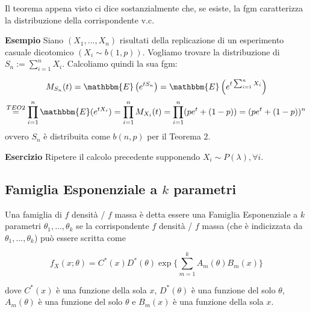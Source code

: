 \begin{oss}
Il teorema appena visto ci dice sostanzialmente che, se esiste, la fgm caratterizza la distribuzione della corrispondente v.c.
\end{oss}
\noindent \textbf{Esempio}
Siano $(X_1,...,X_n)$ risultati della replicazione di un esperimento casuale dicotomico $(X_i \sim b(1,p))$. Vogliamo trovare la distribuzione di $S_n := \displaystyle\sum_{i=1}^n X_i$. Calcoliamo quindi la sua fgm:

$$M_{S_n}(t) = \mathbbm{E} \left( {e^{t S_n}} \right)  = \mathbbm{E} \left( {e^{t \sum_{i=1}^n X_i}} \right) $$
$$\stackrel{TEO 2}
{=} \displaystyle\prod_{i=1}^n \mathbbm{E}({e^{tX_i}}) = \displaystyle\prod_{i=1}^n M_{X_i}(t) = \displaystyle\prod_{i=1}^n (p e^t + (1-p)) = (p e^t + (1-p))^n$$ ovvero $S_n$ è distribuita come $b(n,p)$ per il Teorema 2.

\noindent \textbf{Esercizio}
Ripetere il calcolo precedente supponendo $X_i \sim P(\lambda), \forall i$.

\subsection{Famiglia Esponenziale a $k$ parametri}
Una famiglia di $f$ densità / $f$ massa è detta essere una Famiglia Esponenziale a $k$ parametri $\theta_1,...,\theta_k$ se la corrispondente $f$ densità / $f$ massa (che è indicizzata da $\theta_1,...,\theta_k$) può essere scritta come

$$f_X(x;\theta) = C^*(x) D^*(\theta) \exp \lbrace \displaystyle\sum_{m=1}^k A_m(\theta) B_m (x) \rbrace$$

dove $C^*(x)$ è una funzione della sola $x$, $D^*(\theta)$ è una funzione del solo $\theta$, $A_m(\theta)$ è una funzione del solo $\theta$ e $B_m(x)$ è una funzione della sola $x$.

